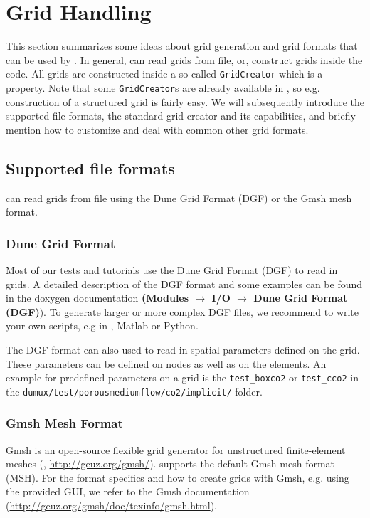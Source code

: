\section{Grid Handling}
\label{sec:gridhandling}

This section summarizes some ideas about grid generation and grid formats that can be used by \Dumux. In general,
\Dumux can read grids from file, or, construct grids inside the code. All grids are constructed inside a so called \texttt{GridCreator} which is a \Dumux property.
Note that some \texttt{GridCreator}s are already available in \Dumux, so e.g.
construction of a structured grid is fairly easy. We will subsequently introduce the supported file formats, the standard grid creator and its capabilities,
and briefly mention how to customize and deal with common other grid formats.

\subsection{Supported file formats}
\Dumux can read grids from file using the Dune Grid Format (DGF) or the Gmsh mesh format.

\subsubsection{Dune Grid Format}
Most of our \Dumux tests and tutorials use the Dune Grid Format (DGF) to read in grids. A detailed description
of the DGF format and some examples can be found in the \Dune doxygen documentation
\textbf{(Modules $\rightarrow$ I/O $\rightarrow$ Dune Grid Format (DGF)}). To generate larger or more
complex DGF files, we recommend to write your own scripts, e.g in \Cplusplus, Matlab or Python.

The DGF format can also used to read in spatial parameters defined on the grid. These parameters can
be defined on nodes as well as on the elements. An example for predefined parameters on a grid is
the \texttt{test\_boxco2} or \texttt{test\_cco2} in the  \texttt{dumux/test/porousmediumflow/co2/implicit/} folder.

\subsubsection{Gmsh Mesh Format}
Gmsh is an open-source flexible grid generator for unstructured finite-element meshes (\cite{GEUZAINE2009}, \url{http://geuz.org/gmsh/}).
\Dumux supports the default Gmsh mesh format (MSH). For the format specifics and how to create grids with Gmsh, e.g. using
the provided GUI, we refer to the Gmsh documentation (\url{http://geuz.org/gmsh/doc/texinfo/gmsh.html}).

